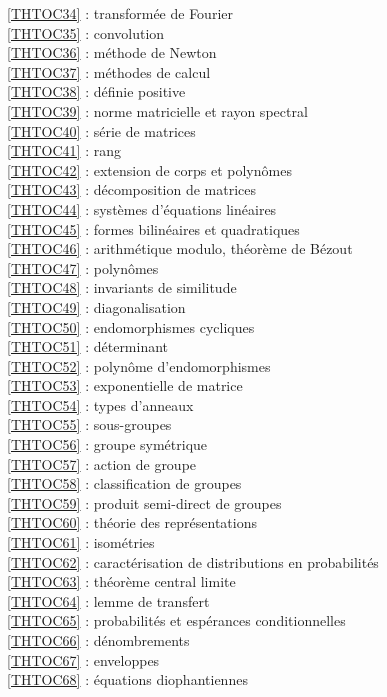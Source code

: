 \ref {THTOC34} : transformée de Fourier\\
\ref {THTOC35} : convolution\\
\ref {THTOC36} : méthode de Newton\\
\ref {THTOC37} : méthodes de calcul\\
\ref {THTOC38} : définie positive\\
\ref {THTOC39} : norme matricielle et rayon spectral\\
\ref {THTOC40} : série de matrices\\
\ref {THTOC41} : rang\\
\ref {THTOC42} : extension de corps et polynômes\\
\ref {THTOC43} : décomposition de matrices\\
\ref {THTOC44} : systèmes d'équations linéaires\\
\ref {THTOC45} : formes bilinéaires et quadratiques\\
\ref {THTOC46} : arithmétique modulo, théorème de Bézout\\
\ref {THTOC47} : polynômes\\
\ref {THTOC48} : invariants de similitude\\
\ref {THTOC49} : diagonalisation\\
\ref {THTOC50} : endomorphismes cycliques\\
\ref {THTOC51} : déterminant\\
\ref {THTOC52} : polynôme d'endomorphismes\\
\ref {THTOC53} : exponentielle de matrice\\
\ref {THTOC54} : types d'anneaux\\
\ref {THTOC55} : sous-groupes\\
\ref {THTOC56} : groupe symétrique\\
\ref {THTOC57} : action de groupe\\
\ref {THTOC58} : classification de groupes\\
\ref {THTOC59} : produit semi-direct de groupes\\
\ref {THTOC60} : théorie des représentations\\
\ref {THTOC61} : isométries\\
\ref {THTOC62} : caractérisation de distributions en probabilités\\
\ref {THTOC63} : théorème central limite\\
\ref {THTOC64} : lemme de transfert\\
\ref {THTOC65} : probabilités et espérances conditionnelles\\
\ref {THTOC66} : dénombrements\\
\ref {THTOC67} : enveloppes\\
\ref {THTOC68} : équations diophantiennes\\
